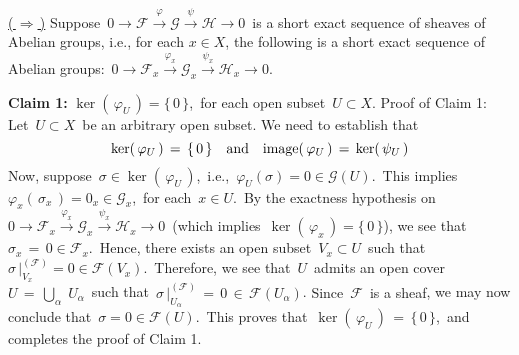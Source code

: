 \vskip 0.3cm
\noindent
\underline{(\,$\Longrightarrow$\,)}\quad
Suppose
\,$0 \longrightarrow \mathscr{F} \overset{\varphi}{\longrightarrow} \mathscr{G} \overset{\psi}{\longrightarrow} \mathscr{H} \longrightarrow 0$\,
is a short exact sequence of sheaves of Abelian groups, i.e.,
for each $x \in X$, the following is a short exact sequence of Abelian groups:
\,$0 \longrightarrow \mathscr{F}_{x} \overset{\varphi_{x}}{\longrightarrow} \mathscr{G}_{x} \overset{\psi_{x}}{\longrightarrow} \mathscr{H}_{x} \longrightarrow 0$.\,


\vskip 0.5cm
\noindent
\textbf{Claim 1:}\; $\ker(\,\varphi_{U}\,) = \{\,0\,\}$,\, for each open subset \,$U \subset X$.
\vskip 0.2cm
\noindent
Proof of Claim 1:\;
Let \,$U \subset X$\, be an arbitrary open subset.
We need to establish that
\begin{equation*}
\ker\!\left(\,\varphi_{U}\,\right) \,=\, \{\,0\,\}
\quad\textnormal{and}\quad
\textnormal{image}\!\left(\,\varphi_{U}\,\right) \,=\, \ker\!\left(\,\psi_{U}\,\right)
\end{equation*}
Now, suppose \,$\sigma \in \ker\!\left(\,\varphi_{U}\,\right)$,\, i.e.,
\,$\varphi_{U}(\sigma) = 0 \in \mathscr{G}(U)$.\,
This implies
\,$\varphi_{x}(\,\sigma_{x}\,) = 0_{x} \in \mathscr{G}_{x}$,\,
for each \,$x \in U$.\,
By the exactness hypothesis on
\,$0 \longrightarrow \mathscr{F}_{x} \overset{\varphi_{x}}{\longrightarrow} \mathscr{G}_{x} \overset{\psi_{x}}{\longrightarrow} \mathscr{H}_{x} \longrightarrow 0$\,
(which implies \,$\ker(\,\varphi_{x}\,) = \{\,0\,\}$), we see that \,$\sigma_{x} \,=\, 0 \in \mathscr{F}_{x}$.\,
Hence, there exists an open subset \,$V_{x} \subset U$\, such that \,$\sigma\,\vert^{(\mathscr{F})}_{V_{x}} = 0 \in \mathscr{F}(V_{x})$.\,
Therefore, we see that \,$U$\, admits an open cover \,$U \,=\, \underset{\alpha}{\bigcup}\;U_{\alpha}$\,
such that \,$\sigma\,\vert^{(\mathscr{F})}_{U_{\alpha}} \,=\, 0 \,\in\, \mathscr{F}(U_{\alpha})$.
{\color{red}Since \,$\mathscr{F}$\, is a sheaf}, we may now conclude that
\,$\sigma = 0 \in \mathscr{F}(U)$.\,
This proves that \,$\ker(\,\varphi_{U}\,) \,=\, \{\,0\,\}$,\, and completes the proof of Claim 1.


